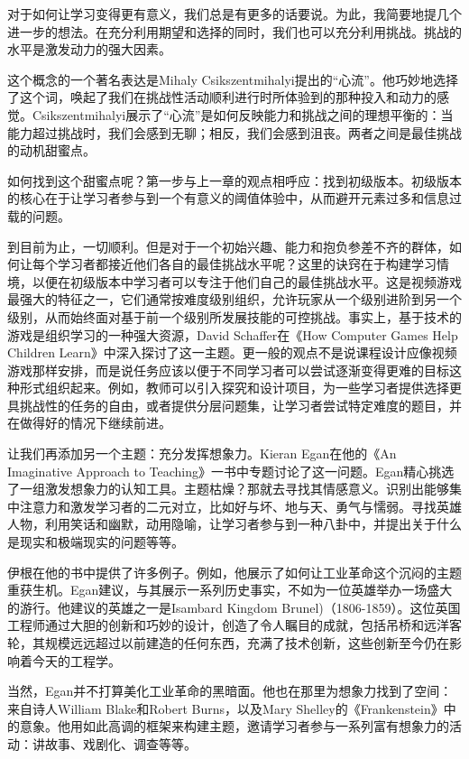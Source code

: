 对于如何让学习变得更有意义，我们总是有更多的话要说。为此，我简要地提几个进一步的想法。在充分利用期望和选择的同时，我们也可以充分利用挑战。挑战的水平是激发动力的强大因素。

这个概念的一个著名表达是Mihaly Csikszentmihalyi提出的“心流”。他巧妙地选择了这个词，唤起了我们在挑战性活动顺利进行时所体验到的那种投入和动力的感觉。Csikszentmihalyi展示了“心流”是如何反映能力和挑战之间的理想平衡的：当能力超过挑战时，我们会感到无聊；相反，我们会感到沮丧。两者之间是最佳挑战的动机甜蜜点。

如何找到这个甜蜜点呢？第一步与上一章的观点相呼应：找到初级版本。初级版本的核心在于让学习者参与到一个有意义的阈值体验中，从而避开元素过多和信息过载的问题。

到目前为止，一切顺利。但是对于一个初始兴趣、能力和抱负参差不齐的群体，如何让每个学习者都接近他们各自的最佳挑战水平呢？这里的诀窍在于构建学习情境，以便在初级版本中学习者可以专注于他们自己的最佳挑战水平。这是视频游戏最强大的特征之一，它们通常按难度级别组织，允许玩家从一个级别进阶到另一个级别，从而始终面对基于前一个级别所发展技能的可控挑战。事实上，基于技术的游戏是组织学习的一种强大资源，David Schaffer在《How Computer Games Help Children Learn》中深入探讨了这一主题。更一般的观点不是说课程设计应像视频游戏那样安排，而是说任务应该以便于不同学习者可以尝试逐渐变得更难的目标这种形式组织起来。例如，教师可以引入探究和设计项目，为一些学习者提供选择更具挑战性的任务的自由，或者提供分层问题集，让学习者尝试特定难度的题目，并在做得好的情况下继续前进。

让我们再添加另一个主题：充分发挥想象力。Kieran Egan在他的《An Imaginative Approach to Teaching》一书中专题讨论了这一问题。Egan精心挑选了一组激发想象力的认知工具。主题枯燥？那就去寻找其情感意义。识别出能够集中注意力和激发学习者的二元对立，比如好与坏、地与天、勇气与懦弱。寻找英雄人物，利用笑话和幽默，动用隐喻，让学习者参与到一种八卦中，并提出关于什么是现实和极端现实的问题等等。

伊根在他的书中提供了许多例子。例如，他展示了如何让工业革命这个沉闷的主题重获生机。Egan建议，与其展示一系列历史事实，不如为一位英雄举办一场盛大的游行。他建议的英雄之一是Isambard Kingdom Brunel)（1806-1859）。这位英国工程师通过大胆的创新和巧妙的设计，创造了令人瞩目的成就，包括吊桥和远洋客轮，其规模远远超过以前建造的任何东西，充满了技术创新，这些创新至今仍在影响着今天的工程学。

当然，Egan并不打算美化工业革命的黑暗面。他也在那里为想象力找到了空间：来自诗人William Blake和Robert Burns，以及Mary Shelley的《Frankenstein》中的意象。他用如此高调的框架来构建主题，邀请学习者参与一系列富有想象力的活动：讲故事、戏剧化、调查等等。

